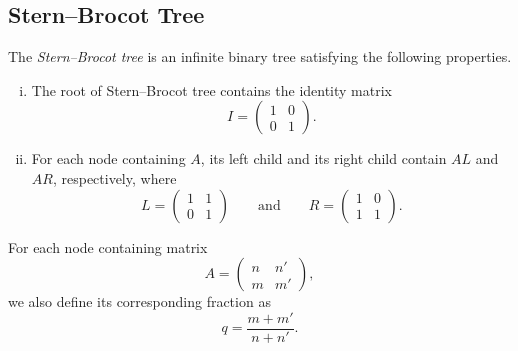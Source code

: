 \documentclass[11pt]{article}
\begin{document}
\subsection{Stern--Brocot Tree}
The \emph{Stern--Brocot tree} is an infinite binary tree satisfying the following properties.
\begin{enumerate}[(i)]
  \item The root of Stern--Brocot tree contains the identity matrix
  \begin{equation*}
    I = \begin{pmatrix} 1 & 0 \\ 0 & 1 \end{pmatrix}.
  \end{equation*}
  \item For each node containing $A$, its left child and its right child contain $AL$ and $AR$, respectively, where
  \begin{equation*}
    L = \begin{pmatrix} 1 & 1 \\ 0 & 1 \end{pmatrix}
    \qquad \text{and} \qquad
    R = \begin{pmatrix} 1 & 0 \\ 1 & 1 \end{pmatrix}.
  \end{equation*}
\end{enumerate}
For each node containing matrix
\begin{equation*}
  A = \begin{pmatrix} n & n' \\ m & m' \end{pmatrix},
\end{equation*}
we also define its corresponding fraction as
\begin{equation*}
  q = \frac{m + m'}{n + n'}.
\end{equation*}
\end{document}
